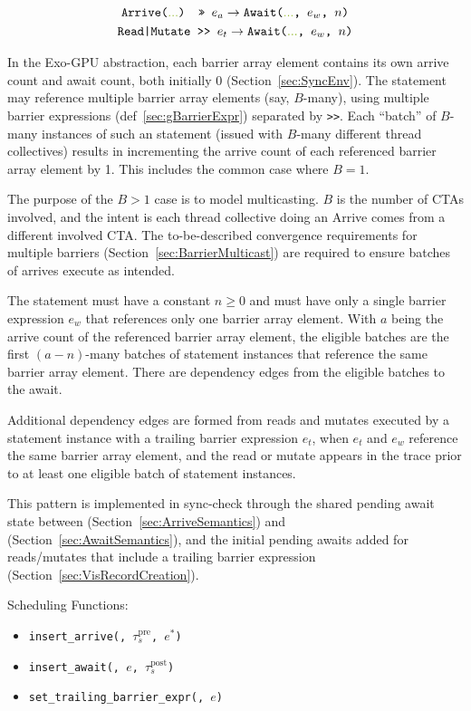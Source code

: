 
\begin{gather*}
    \texttt{Arrive(\codecomment{...}) >> $e_a$} \to \texttt{Await(\codecomment{...}, $e_w$, $n$)} \\
    \texttt{Read|Mutate >}\texttt{> } e_t \to \texttt{Await(\codecomment{...}, $e_w$, $n$)}
\end{gather*}

In the Exo-GPU abstraction, each barrier array element contains its own arrive count and await count, both initially 0 (Section~\ref{sec:SyncEnv}).
The  statement may reference multiple barrier array elements (say, $B$-many), using multiple barrier expressions (def~\ref{sec:gBarrierExpr}) separated by \texttt{>}\texttt{>}.
Each ``batch'' of $B$-many instances of such an  statement (issued with $B$-many different thread collectives) results in incrementing the arrive count of each referenced barrier array element by 1.
This includes the common case where $B=1$.

The purpose of the $B > 1$ case is to model multicasting.
$B$ is the number of CTAs involved, and the intent is each thread collective doing an Arrive comes from a different involved CTA.
The to-be-described convergence requirements for multiple barriers (Section~\ref{sec:BarrierMulticast}) are required to ensure batches of arrives execute as intended.

The  statement must have a constant $n \ge 0$ and must have only a single barrier expression $e_w$ that references only one barrier array element.
With $a$ being the arrive count of the referenced barrier array element, the eligible batches are the first $(a-n)$-many batches of  statement instances that reference the same barrier array element.
There are dependency edges from the eligible batches to the await.

Additional dependency edges are formed from reads and mutates executed by a statement instance with a trailing barrier expression $e_t$, when $e_t$ and $e_w$ reference the same barrier array element, and the read or mutate appears in the trace prior to at least one eligible batch of  statement instances.

This pattern is implemented in sync-check through the shared pending await state between  (Section~\ref{sec:ArriveSemantics}) and  (Section~\ref{sec:AwaitSemantics}), and the initial pending awaits added for reads/mutates that include a trailing barrier expression (Section~\ref{sec:VisRecordCreation}).

Scheduling Functions:
\begin{itemize}
  \item \texttt{insert\_arrive(, $\tau_s^\mathrm{pre}$, $e^*$)}
  \item \texttt{insert\_await(, $e$, $\tau_s^\mathrm{post}$)}
  \item \texttt{set\_trailing\_barrier\_expr(, $e$)}
\end{itemize}

